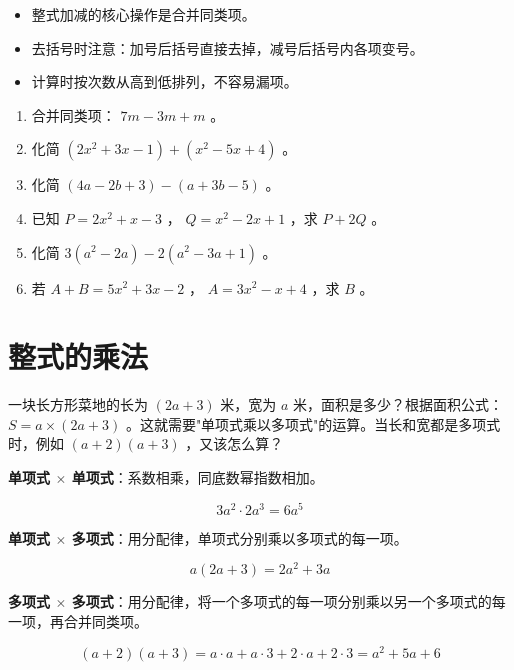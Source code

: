 \begin{keytakeaway}


\begin{itemize}
  \item 整式加减的核心操作是合并同类项。
  \item 去括号时注意：加号后括号直接去掉，减号后括号内各项变号。
  \item 计算时按次数从高到低排列，不容易漏项。
\end{itemize}


\end{keytakeaway}

\begin{practice}


\begin{enumerate}
  \item 合并同类项： $7m - 3m + m$ 。
  \item 化简 $(2x^2 + 3x - 1) + (x^2 - 5x + 4)$ 。
  \item 化简 $(4a - 2b + 3) - (a + 3b - 5)$ 。
  \item 已知 $P = 2x^2 + x - 3$ ， $Q = x^2 - 2x + 1$ ，求 $P + 2Q$ 。
  \item 化简 $3(a^2 - 2a) - 2(a^2 - 3a + 1)$ 。
  \item 若 $A + B = 5x^2 + 3x - 2$ ， $A = 3x^2 - x + 4$ ，求 $B$ 。
\end{enumerate}


\end{practice}

\section*{整式的乘法}


\begin{explore}


一块长方形菜地的长为 $(2a + 3)$ 米，宽为 $a$ 米，面积是多少？根据面积公式： $S = a \times (2a + 3)$ 。这就需要"单项式乘以多项式"的运算。当长和宽都是多项式时，例如 $(a + 2)(a + 3)$ ，又该怎么算？

\end{explore}

\begin{understand}


\textbf{单项式 $\times$ 单项式}：系数相乘，同底数幂指数相加。

\[
3a^2 \cdot 2a^3 = 6a^5
\]


\textbf{单项式 $\times$ 多项式}：用分配律，单项式分别乘以多项式的每一项。

\[
a(2a + 3) = 2a^2 + 3a
\]


\textbf{多项式 $\times$ 多项式}：用分配律，将一个多项式的每一项分别乘以另一个多项式的每一项，再合并同类项。

\[
(a + 2)(a + 3) = a \cdot a + a \cdot 3 + 2 \cdot a + 2 \cdot 3 = a^2 + 5a + 6
\]


\end{understand}

